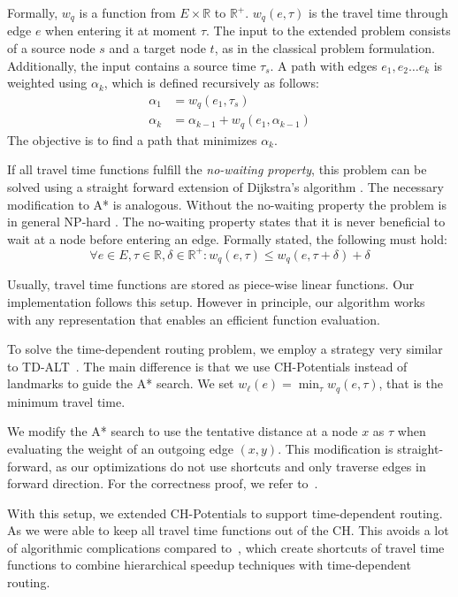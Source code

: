 \documentclass[letterpaper]{article} %
\begin{document}
Formally, $w_q$ is a function from $E\times \mathbb{R}$ to $\mathbb{R}^+$.
$w_q(e, \tau)$ is the travel time through edge $e$ when entering it at moment $\tau$.
The input to the extended problem consists of a source node $s$ and a target node $t$, as in the classical problem formulation.
Additionally, the input contains a source time $\tau_s$.
A path with edges $e_1,e_2\ldots e_k$ is weighted using $\alpha_k$, which is defined recursively as follows:\[
\begin{split}
\alpha_{1} & = w_q(e_1, \tau_s) \\
\alpha_{k} & = \alpha_{k-1} + w_q(e_1, \alpha_{k-1})
\end{split}
\]
The objective is to find a path that minimizes $\alpha_k$.

If all travel time functions fulfill the \emph{no-waiting property}, this problem can be solved using a straight forward extension of Dijkstra's algorithm \cite{d-aassp-69}.
The necessary modification to A* is analogous.
Without the no-waiting property the problem is in general NP-hard \cite{or-tnp-89}.
The no-waiting property states that it is never beneficial to wait at a node before entering an edge.
Formally stated, the following must hold:\[
\forall e\in E,\tau\in \mathbb{R},\delta\in \mathbb{R}^+: w_q(e, \tau) \le w_q(e, \tau+\delta) + \delta
\]

Usually, travel time functions are stored as piece-wise linear functions.
Our implementation follows this setup.
However in principle, our algorithm works with any representation that enables an efficient function evaluation.

To solve the time-dependent routing problem, we employ a strategy very similar to TD-ALT~\cite{ndls-bastd-12}.
The main difference is that we use CH-Potentials instead of landmarks to guide the A* search.
We set $w_\ell(e) = \min_\tau w_q(e,\tau)$, that is the minimum travel time.

We modify the A* search to use the tentative distance at a node $x$ as $\tau$ when evaluating the weight of an outgoing edge $(x,y)$.
This modification is straight-forward, as our optimizations do not use shortcuts and only traverse edges in forward direction.
For the correctness proof, we refer to~\cite{dw-lbrdg-07}.

With this setup, we extended CH-Potentials to support time-dependent routing.
As we were able to keep all travel time functions out of the CH.
This avoids a lot of algorithmic complications compared to~\cite{bgsv-mtdtt-13,bdpw-dtdrp-16,swz-sfert-19}, which create shortcuts of travel time functions to combine hierarchical speedup techniques with time-dependent routing.
\end{document}
